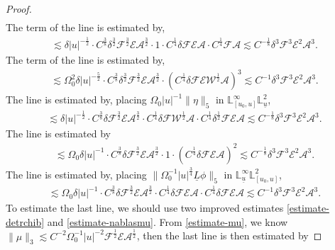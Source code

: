 \documentclass[11pt,reqno]{amsart}
\theoremstyle{definition}
\numberwithin{equation}{section}
\renewcommand{\L}{\mathbb{L}}
\def\Lb{\underline{L}}
\def\ub{\underline{u}}
\begin{document}
\begin{proof}
\begin{align*}
\end{align*}
The  term of the  line is estimated by, 
\begin{align*}
\lesssim\delta|u|^{-\frac{1}{2}}\cdot C^{\frac{3}{8}}\delta^{\frac{3}{2}}\mathscr{F}^{\frac{3}{2}}\mathscr{E}\mathcal{A}^{\frac{3}{2}}\cdot  1\cdot C^{\frac{1}{4}}\delta\mathscr{F}\mathscr{E}\mathcal{A}\cdot C^{\frac{1}{4}}\mathscr{F}\mathcal{A}\lesssim C^{-\frac{1}{8}}\delta^3\mathscr{F}^3\mathscr{E}^2\mathcal{A}^3.
\end{align*}
The  term of the  line is estimated by,
\begin{align*}
\lesssim\Omega_0^2\delta|u|^{-\frac{5}{2}}\cdot C^{\frac{3}{8}}\delta^{\frac{3}{2}}\mathscr{F}^{\frac{3}{2}}\mathscr{E}\mathcal{A}^{\frac{3}{2}}\cdot  (C^{\frac{1}{4}}\delta\mathscr{F}\mathscr{E}\mathscr{W}^{\frac{1}{2}}\mathcal{A})^3\lesssim C^{-1}\delta^3\mathscr{F}^3\mathscr{E}^2\mathcal{A}^3.
\end{align*}
The  line is estimated by, placing $\Omega_0|u|^{-1}\|\eta\|_5$ in $\L^\infty_{[u_0,u]}\L^2_{\ub}$,
\begin{align*}
\lesssim\delta|u|^{-\frac{1}{2}}\cdot C^{\frac{3}{8}}\delta\mathscr{F}^{\frac{3}{2}}\mathscr{E}\mathcal{A}^{\frac{3}{2}}\cdot C^{\frac{1}{4}}\delta\mathscr{F}\mathscr{W}^{\frac{1}{2}}\mathcal{A}\cdot C^{\frac{1}{4}}\delta^{\frac{1}{2}}\mathscr{F}\mathscr{E}\mathcal{A}\lesssim C^{-\frac{1}{8}}\delta^3\mathscr{F}^3\mathscr{E}^2\mathcal{A}^3.
\end{align*}
The  line is estimated by
\begin{align*}
\lesssim\Omega_0\delta|u|^{-1}\cdot C^{\frac{3}{8}}\delta\mathscr{F}^{\frac{3}{2}}\mathscr{E}\mathcal{A}^{\frac{3}{2}}\cdot 1\cdot  (C^{\frac{1}{4}}\delta\mathscr{F}\mathscr{E}\mathcal{A})^2\lesssim C^{-\frac{1}{8}}\delta^3\mathscr{F}^3\mathscr{E}^2\mathcal{A}^3.
\end{align*}
The  line is estimated by, placing $\|\Omega_0^{-1}|u|^{\frac{3}{4}}\Lb\phi\|_5$ in $\L^\infty_{\ub}\L^2_{[u_0,u]}$,
\begin{align*}
\lesssim\Omega_0\delta|u|^{-1}\cdot C^{\frac{3}{8}}\delta\mathscr{F}^{\frac{3}{2}}\mathscr{E}\mathcal{A}^{\frac{3}{2}}\cdot C^{\frac{1}{4}}\delta\mathscr{F}\mathscr{E}\mathcal{A}\cdot C^{\frac{1}{4}}\delta\mathscr{F}\mathscr{E}\mathcal{A}\lesssim C^{-1}\delta^3\mathscr{F}^3\mathscr{E}^2\mathcal{A}^3.
\end{align*}
To estimate the last line, we should use two improved estimates \eqref{estimate-detrchib} and \eqref{estimate-nablasmu}. From \eqref{estimate-mu}, we know $\|\mu\|_3\lesssim C^{-2}\Omega_0^{-1}|u|^{-2}\mathscr{F}^{\frac{1}{2}}\mathscr{E}\mathcal{A}^{\frac{1}{2}}$, then the last line is then estimated by

\end{proof}
\end{document}
